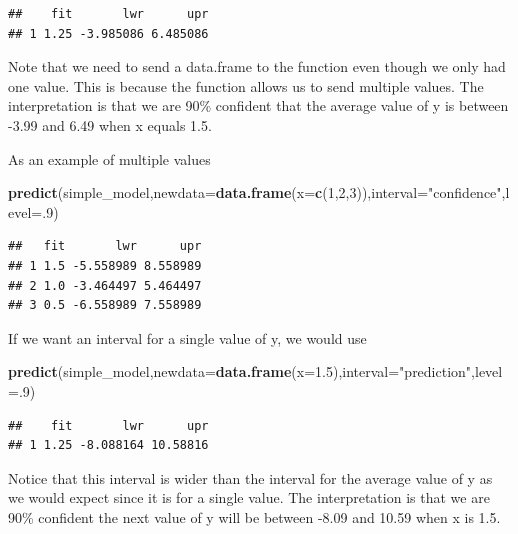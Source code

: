 \documentclass[]{book}
\newenvironment{Shaded}{\begin{snugshade}}{\end{snugshade}}
\newcommand{\KeywordTok}[1]{\textcolor[rgb]{0.13,0.29,0.53}{\textbf{#1}}}
\newcommand{\DataTypeTok}[1]{\textcolor[rgb]{0.13,0.29,0.53}{#1}}
\newcommand{\DecValTok}[1]{\textcolor[rgb]{0.00,0.00,0.81}{#1}}
\newcommand{\FloatTok}[1]{\textcolor[rgb]{0.00,0.00,0.81}{#1}}
\newcommand{\StringTok}[1]{\textcolor[rgb]{0.31,0.60,0.02}{#1}}
\newcommand{\NormalTok}[1]{#1}
\theoremstyle{definition}
\theoremstyle{definition}
\theoremstyle{definition}
\theoremstyle{remark}
\begin{document}
\begin{verbatim}
##    fit       lwr      upr
## 1 1.25 -3.985086 6.485086
\end{verbatim}

Note that we need to send a data.frame to the function even though we
only had one value. This is because the function allows us to send
multiple values. The interpretation is that we are 90\% confident that
the average value of y is between -3.99 and 6.49 when x equals 1.5.

As an example of multiple values

\begin{Shaded}
\begin{Highlighting}[]
\KeywordTok{predict}\NormalTok{(simple_model,}\DataTypeTok{newdata=}\KeywordTok{data.frame}\NormalTok{(}\DataTypeTok{x=}\KeywordTok{c}\NormalTok{(}\DecValTok{1}\NormalTok{,}\DecValTok{2}\NormalTok{,}\DecValTok{3}\NormalTok{)),}\DataTypeTok{interval=}\StringTok{"confidence"}\NormalTok{,}\DataTypeTok{level=}\NormalTok{.}\DecValTok{9}\NormalTok{)}
\end{Highlighting}
\end{Shaded}

\begin{verbatim}
##   fit       lwr      upr
## 1 1.5 -5.558989 8.558989
## 2 1.0 -3.464497 5.464497
## 3 0.5 -6.558989 7.558989
\end{verbatim}

If we want an interval for a single value of y, we would use

\begin{Shaded}
\begin{Highlighting}[]
\KeywordTok{predict}\NormalTok{(simple_model,}\DataTypeTok{newdata=}\KeywordTok{data.frame}\NormalTok{(}\DataTypeTok{x=}\FloatTok{1.5}\NormalTok{),}\DataTypeTok{interval=}\StringTok{"prediction"}\NormalTok{,}\DataTypeTok{level=}\NormalTok{.}\DecValTok{9}\NormalTok{)}
\end{Highlighting}
\end{Shaded}

\begin{verbatim}
##    fit       lwr      upr
## 1 1.25 -8.088164 10.58816
\end{verbatim}

Notice that this interval is wider than the interval for the average
value of y as we would expect since it is for a single value. The
interpretation is that we are 90\% confident the next value of y will be
between -8.09 and 10.59 when x is 1.5.
\end{document}
